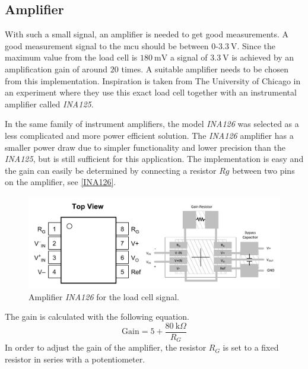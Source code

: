 \subsection{Amplifier}
With such a small signal, an amplifier is needed to get good measurements. A good measurement signal to the \gls{mcu} should be between $0$-$3.3~\textrm{V}$. Since the maximum value from the load cell is $180~\textrm{mV}$ a signal of $3.3~\textrm{V}$ is achieved by an amplification gain of around $20$ times.  
A suitable amplifier needs to be chosen from this implementation. Inspiration is taken from The University of Chicago\cite{UoC} in an experiment where they use this exact load cell together with an instrumental amplifier called \emph{INA125}. %

In the same family of instrument amplifiers, the model \emph{INA126} was selected as a less complicated and more power efficient solution.  
The \emph{INA126} amplifier has a smaller power draw due to simpler functionality and lower precision than the \emph{INA125}, but is still sufficient for this application.  
The implementation is easy and the gain can easily be determined by connecting a resistor $Rg$ between two pins on the amplifier, see \autoref{INA126}.

\begin{figure}[H]
\begin{center}
	\includegraphics[width = .8\textwidth]{Figures/INA126_pinout.png}
	\caption{Amplifier \emph{INA126} for the load cell signal.}
	\label{INA126}
\end{center}
\end{figure}

\noindent The gain is calculated with the following equation.  
\begin{equation}
\textrm{Gain} = 5 + \frac{80~\textrm{k}\Omega}{R_G}
\end{equation}
In order to adjust the gain of the amplifier, the resistor $R_G$ is set to a fixed resistor in series with a potentiometer.


